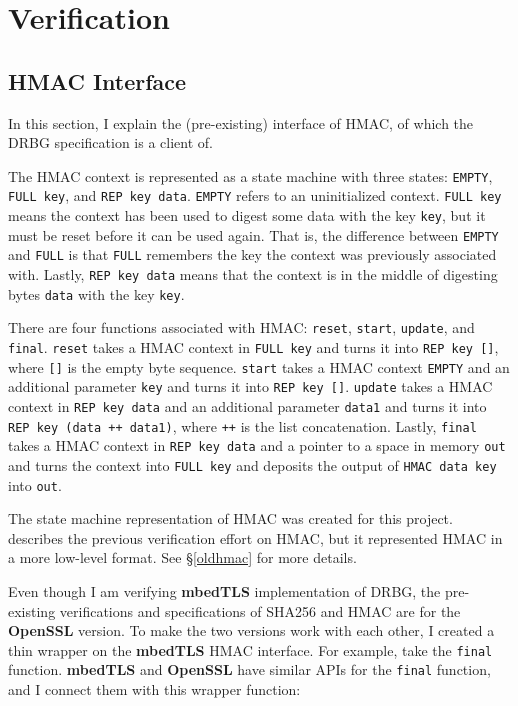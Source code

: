 \documentclass[pageno]{jpaper}
\newcommand{\stdtitle}[1]{\textbf{#1}}
\begin{document}
\section{Verification}
\subsection{HMAC Interface}\label{hmac_interface}
In this section, I explain the (pre-existing) interface of HMAC, of which the DRBG specification is a client of.

The HMAC context is represented as a state machine with three states: \lstinline{EMPTY}, \lstinline{FULL key}, and \lstinline{REP key data}. \lstinline{EMPTY} refers to an uninitialized context. \lstinline{FULL key} means the context has been used to digest some data with the key \lstinline{key}, but it must be reset before it can be used again. That is, the difference between \lstinline{EMPTY} and \lstinline{FULL} is that \lstinline{FULL} remembers the key the context was previously associated with. Lastly, \lstinline{REP key data} means that the context is in the middle of digesting bytes \lstinline{data} with the key \lstinline{key}.

There are four functions associated with HMAC: \lstinline{reset}, \lstinline{start}, \lstinline{update}, and \lstinline{final}. \lstinline{reset} takes a HMAC context in \lstinline{FULL key} and turns it into \lstinline{REP key []}, where \lstinline{[]} is the empty byte sequence. \lstinline{start} takes a HMAC context \lstinline{EMPTY} and an additional parameter \lstinline{key} and turns it into \lstinline{REP key []}. \lstinline{update} takes a HMAC context in \lstinline{REP key data} and an additional parameter \lstinline{data1} and turns it into \lstinline{REP key (data ++ data1)}, where \lstinline{++} is the list concatenation. Lastly, \lstinline{final} takes a HMAC context in \lstinline{REP key data} and a pointer to a space in memory \lstinline{out} and turns the context into \lstinline{FULL key} and deposits the output of \lstinline{HMAC data key} into \lstinline{out}.

The state machine representation of HMAC was created for this project. \cite{hmac} describes the previous verification effort on HMAC, but it represented HMAC in a more low-level format. See \S \ref{oldhmac} for more details.

Even though I am verifying \stdtitle{mbedTLS} implementation of DRBG, the pre-existing verifications and specifications of SHA256 and HMAC are for the \stdtitle{OpenSSL} version. To make the two versions work with each other, I created a thin wrapper on the \stdtitle{mbedTLS} HMAC interface. For example, take the \lstinline{final} function. \stdtitle{mbedTLS} and \stdtitle{OpenSSL} have similar APIs for the \lstinline{final} function, and I connect them with this wrapper function:
\end{document}

